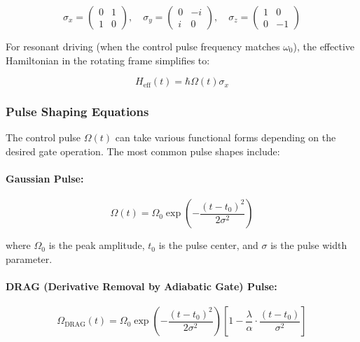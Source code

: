 \documentclass[12pt,a4paper]{article}
\theoremstyle{definition}
\begin{document}
\begin{equation}
\sigma_x = \begin{pmatrix} 0 & 1 \\ 1 & 0 \end{pmatrix}, \quad
\sigma_y = \begin{pmatrix} 0 & -i \\ i & 0 \end{pmatrix}, \quad
\sigma_z = \begin{pmatrix} 1 & 0 \\ 0 & -1 \end{pmatrix}
\label{eq:pauli}
\end{equation}

For resonant driving (when the control pulse frequency matches $\omega_0$), the effective Hamiltonian in the rotating frame simplifies to:

\begin{equation}
H_{\text{eff}}(t) = \hbar \Omega(t)\sigma_x
\label{eq:hamiltonian_rotating}
\end{equation}

\subsubsection{Pulse Shaping Equations}

The control pulse $\Omega(t)$ can take various functional forms depending on the desired gate operation. The most common pulse shapes include:

\paragraph{Gaussian Pulse:}
\begin{equation}
\boxed{
\Omega(t) = \Omega_0 \exp\left(-\frac{(t-t_0)^2}{2\sigma^2}\right)
}
\label{eq:gaussian}
\end{equation}

where $\Omega_0$ is the peak amplitude, $t_0$ is the pulse center, and $\sigma$ is the pulse width parameter.

\paragraph{DRAG (Derivative Removal by Adiabatic Gate) Pulse:}
\begin{equation}
\Omega_{\text{DRAG}}(t) = \Omega_0 \exp\left(-\frac{(t-t_0)^2}{2\sigma^2}\right) \left[1 - \frac{\lambda}{\alpha} \cdot \frac{(t-t_0)}{\sigma^2}\right]
\label{eq:drag}
\end{equation}
\end{document}
